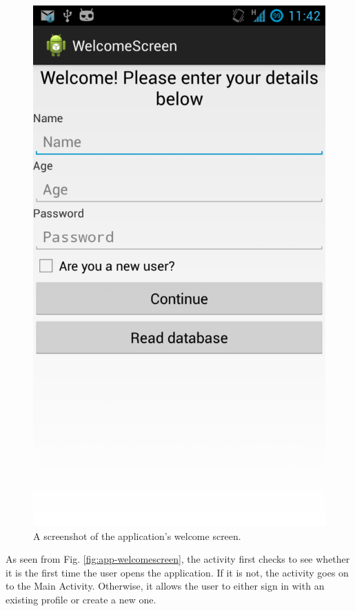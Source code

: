 \begin{figure}
 \centering 
 \includegraphics[clip = true, trim = 0 370 0 60, scale=0.2]{welcome_screen}
 \caption{A screenshot of the application's welcome screen.}
 \label{fig:welcomescreen-screenshot}
\end{figure}

As seen from Fig. \ref{fig:app-welcomescreen}, the
activity first checks to see whether it is the first time the user opens the
application. If it is not, the activity goes on to the Main Activity. Otherwise, it allows
the user to either sign in with an existing profile or create a new one.

